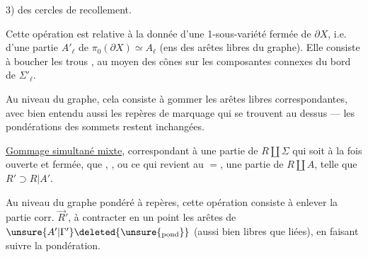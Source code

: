 3)   des cercles de recollement.

Cette opération est relative à la donnée d'une 1-sous-variété fermée de $\partial X$, i.e. d'une partie $A'_{\ell}$ de $\pi_0(\partial X)\simeq A_{\ell}$ (ens des arêtes libres du graphe). Elle consiste à boucher les trous , au moyen des cônes sur les composantes connexes du bord de $\Sigma'_{\ell}$.

Au niveau du graphe, cela consiste à gommer les arêtes libres correspondantes, avec bien entendu aussi les repères de marquage qui se trouvent au dessus ---  les pondérations des sommets restent inchangées.

\quad \uline{Gommage simultané mixte},  correspondant à une partie    de $R\amalg\Sigma$ qui soit à la fois ouverte et fermée,   que  , , ou ce qui revient au $=$, une partie  de $R\amalg A$, telle que $R'\supset R|A'$.

Au niveau du graphe pondéré à repères, cette opération consiste à enlever   la partie corr. $\vec R'$, à contracter en un point les arêtes de $\unsure{A'|\Gamma'}\deleted{\unsure{{}_{\mathrm{pond}}}}$ (aussi bien libres que liées), en faisant suivre la pondération.

